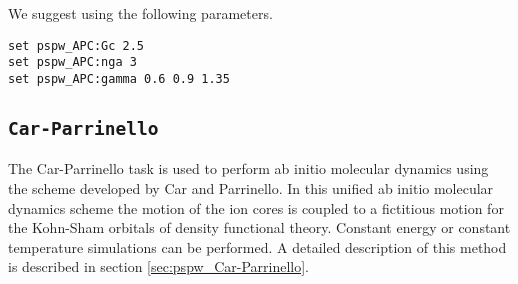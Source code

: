 We suggest using the following parameters.
\begin{verbatim}
set pspw_APC:Gc 2.5
set pspw_APC:nga 3
set pspw_APC:gamma 0.6 0.9 1.35 
\end{verbatim}


\subsection{\tt Car-Parrinello}
\label{sec:pspw_CP}
The Car-Parrinello task is used to perform ab initio molecular dynamics
using the scheme developed by Car and Parrinello.  In this unified ab
initio molecular dynamics scheme the motion of the ion cores is coupled to
a fictitious motion for the Kohn-Sham orbitals of density functional
theory.  Constant energy or constant temperature simulations can be
performed.  A detailed description of this method
is described in section \ref{sec:pspw_Car-Parrinello}.

